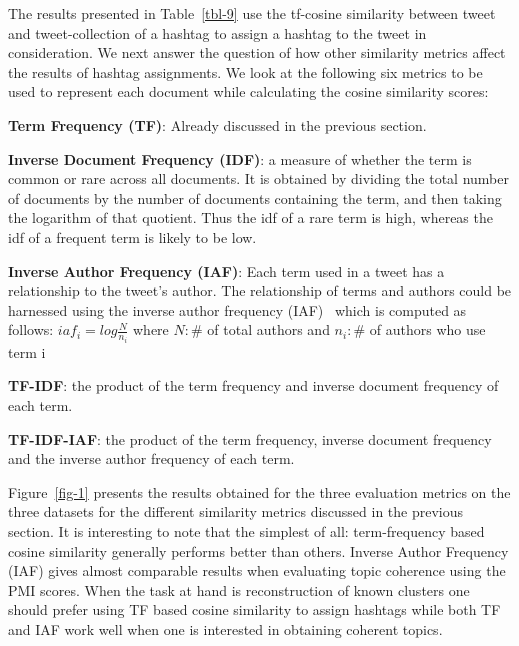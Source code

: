 \documentclass[10pt,a5paper,twoside]{article}
\begin{document}
The results presented in Table~\ref{tbl-9} use the tf-cosine
similarity between tweet and tweet-collection of a hashtag to assign a
hashtag to the tweet in consideration. We next answer the question of
how other similarity metrics affect the results of hashtag
assignments. We look at the following six metrics to be used to
represent each document while calculating the cosine similarity
scores:
\begin{description}
\item{\bf Term Frequency (TF)}: Already discussed in the previous section.
\item{\bf Inverse Document Frequency (IDF)}:  a measure of whether the term is common or rare across all documents. It is obtained by dividing the total number of documents by the number of documents containing the term, and then taking the logarithm of that quotient. Thus the idf of a rare term is high, whereas the idf of a frequent term is likely to be low.
\item{\bf Inverse Author Frequency (IAF)}: Each term used in a tweet has a relationship to the tweet's author. The relationship of terms and authors could be harnessed using the inverse author frequency (IAF)~\cite{iaf} which is computed as follows:
$iaf_i = log \frac{N}{n_i}$
where $N: \#$ of total authors and $n_i: \#$ of authors who use term i
\item{\bf TF-IDF}: the product of the term frequency and inverse document frequency of each term.
\item{\bf TF-IDF-IAF}: the product of the term frequency, inverse document frequency and the inverse author frequency of each term.
\end{description}


Figure~\ref{fig-1} presents the results obtained for the three
evaluation metrics on the three datasets for the different similarity
metrics discussed in the previous section. It is interesting to note
that the simplest of all: term-frequency based cosine similarity
generally performs better than others. Inverse Author Frequency (IAF)
gives almost comparable results when evaluating topic coherence using
the PMI scores. When the task at hand is reconstruction of known
clusters one should prefer using TF based cosine similarity to assign
hashtags while both TF and IAF work well when one is interested in
obtaining coherent topics.
\end{document}
